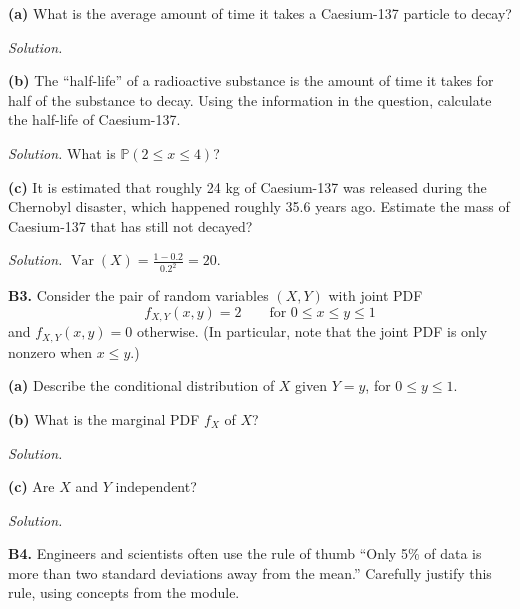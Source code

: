 \documentclass[
  a4paper,
]{book}
\theoremstyle{definition}
\theoremstyle{definition}
\theoremstyle{definition}
\theoremstyle{definition}
\theoremstyle{remark}
\begin{document}
\textbf{(a)} What is the average amount of time it takes a Caesium-137 particle to decay?

\begin{myanswers}
\emph{Solution.}

\end{myanswers}

\textbf{(b)} The ``half-life'' of a radioactive substance is the amount of time it takes for half of the substance to decay. Using the information in the question, calculate the half-life of Caesium-137.

\begin{myanswers}
\emph{Solution.} What is \(\mathbb P(2 \leq x \leq 4)\)?

\end{myanswers}

\textbf{(c)} It is estimated that roughly 24 kg of Caesium-137 was released during the Chernobyl disaster, which happened roughly 35.6 years ago. Estimate the mass of Caesium-137 that has still not decayed?

\begin{myanswers}
\emph{Solution.} \({\displaystyle \operatorname{Var}(X) = \frac{1 - 0.2}{0.2^2} = 20}\).

\end{myanswers}

\textbf{B3.} Consider the pair of random variables \((X,Y)\) with joint PDF
\[ f_{X,Y}(x,y) = 2 \qquad \text{for $0 \leq x \leq y \leq 1$} \]
and \(f_{X,Y}(x,y) = 0\) otherwise. (In particular, note that the joint PDF is only nonzero when \(x \leq y\).)

\textbf{(a)} Describe the conditional distribution of \(X\) given \(Y = y\), for \(0 \leq y \leq 1\).

\textbf{(b)} What is the marginal PDF \(f_X\) of \(X\)?

\begin{myanswers}
\emph{Solution.}

\end{myanswers}

\textbf{(c)} Are \(X\) and \(Y\) independent?

\begin{myanswers}
\emph{Solution.}

\end{myanswers}

\textbf{B4.} Engineers and scientists often use the rule of thumb ``Only 5\% of data is more than two standard deviations away from the mean.'' Carefully justify this rule, using concepts from the module.
\end{document}
